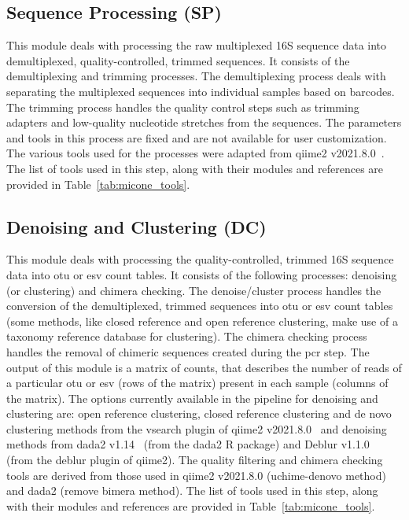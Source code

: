\documentclass[letterpaper,12pt]{article}
\begin{document}
  \subsection*{Sequence Processing (SP)}
  \vspace{-5mm}
  This module deals with processing the raw multiplexed 16S sequence data into demultiplexed, quality-controlled, trimmed sequences.
  It consists of the demultiplexing and trimming processes.
  The demultiplexing process deals with separating the multiplexed sequences into individual samples based on barcodes.
  The trimming process handles the quality control steps such as trimming adapters and low-quality nucleotide stretches from the sequences.
  The parameters and tools in this process are fixed and are not available for user customization.
  The various tools used for the processes were adapted from \ac{qiime2} v2021.8.0~\cite{bolyenReproducibleInteractiveScalable2019}.
  The list of tools used in this step, along with their modules and references are provided in Table~\ref{tab:micone_tools}.

  \subsection*{Denoising and Clustering (DC)}
  \vspace{-5mm}
  This module deals with processing the quality-controlled, trimmed 16S sequence data into \ac{otu} or \ac{esv} count tables.
  It consists of the following processes: denoising (or clustering) and chimera checking.
  The denoise/cluster process handles the conversion of the demultiplexed, trimmed sequences into \ac{otu} or \ac{esv} count tables (some methods, like closed reference and open reference clustering, make use of a taxonomy reference database for clustering).
  The chimera checking process handles the removal of chimeric sequences created during the \ac{pcr} step.
  The output of this module is a matrix of counts, that describes the number of reads of a particular \ac{otu} or \ac{esv} (rows of the matrix) present in each sample (columns of the matrix).
  The options currently available in the pipeline for denoising and clustering are: open reference clustering, closed reference clustering and de novo clustering methods from the vsearch plugin of \ac{qiime2} v2021.8.0~\cite{bolyenReproducibleInteractiveScalable2019} and denoising methods from \ac{dada2} v1.14~\cite{Callahan2016} (from the \ac{dada2} R package) and Deblur v1.1.0~\cite{Amir2017} (from the deblur plugin of \ac{qiime2}).
  The quality filtering and chimera checking tools are derived from those used in \ac{qiime2} v2021.8.0 (uchime-denovo method) and \ac{dada2} (remove bimera method).
  The list of tools used in this step, along with their modules and references are provided in Table~\ref{tab:micone_tools}.
\end{document}
